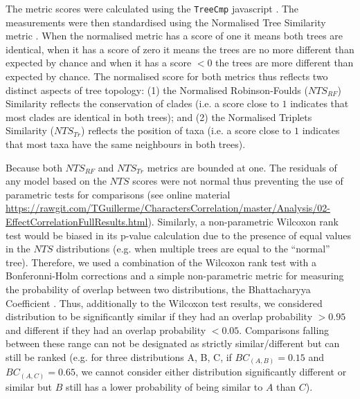\documentclass[12pt,letterpaper]{article}
\begin{document}
The metric scores were calculated using the \texttt{TreeCmp} javascript \citep{Bogdanowicz2012}.
The measurements were then standardised using the Normalised Tree Similarity metric \citep[$NTS$; i.e. centering the metrics scores using the mean metric score for 1000 pairwise comparisons between random trees with $n$ taxa;][]{Bogdanowicz2012,Guillerme2016146}.
When the normalised metric has a score of one it means both trees are identical, when it has a score of zero it means the trees are no more different than expected by chance and when it has a score $<0$ the trees are more different than expected by chance.
The normalised score for both metrics thus reflects two distinct aspects of tree topology: (1) the Normalised Robinson-Foulds ($NTS_{RF}$) Similarity reflects the conservation of clades (i.e. a score close to $1$ indicates that most clades are identical in both trees); and (2) the Normalised Triplets Similarity ($NTS_{Tr}$) reflects the position of taxa (i.e. a score close to $1$ indicates that most taxa have the same neighbours in both trees).

Because both $NTS_{RF}$ and $NTS_{Tr}$ metrics are bounded at one.
The residuals of any model based on the $NTS$ scores were not normal thus preventing the use of parametric tests for comparisons (see online material \url{https://rawgit.com/TGuillerme/CharactersCorrelation/master/Analysis/02-EffectCorrelationFullResults.html}). 
Similarly, a non-parametric Wilcoxon rank test \citep{hollander2013nonparametric} would be biased in its p-value calculation due to the presence of equal values in the $NTS$ distributions (e.g. when multiple trees are equal to the ``normal'' tree).
Therefore, we used a combination of the Wilcoxon rank test with a Bonferonni-Holm corrections \citep[to ensure our significant results were robust to Type I error rate inflation;][]{holm1979simple} and a simple non-parametric metric for measuring the probability of overlap between two distributions, the Bhattacharyya Coefficient \citep[$BC$;][]{Bhattacharyya,Guillerme2016146,soto2016trace}.
Thus, additionally to the Wilcoxon test results, we considered distribution to be significantly similar if they had an overlap probability $>0.95$ and different if they had an overlap probability $<0.05$.
Comparisons falling between these range can not be designated as strictly similar/different but can still be ranked (e.g. for three distributions A, B, C, if $BC_{(A,B)} = 0.15$ and $BC_{(A,C)} = 0.65$, we cannot consider either distribution significantly different or similar but $B$ still has a lower probability of being similar to $A$ than $C$).
\end{document}
